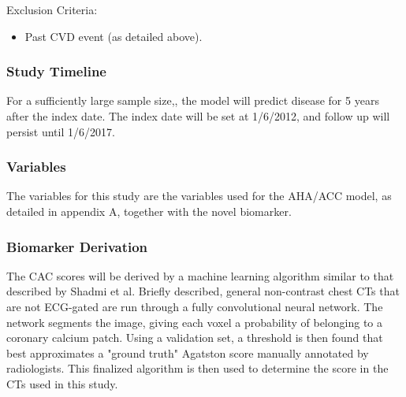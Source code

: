 \documentclass[a4paper,12pt]{article}
\begin{document}
		Exclusion Criteria:
		\begin{itemize}
			\item Past CVD event (as detailed above).
		\end{itemize}
		
		\subsubsection*{Study Timeline}
		For a sufficiently large sample size,, the model will predict disease for 5 years after the index date. The index date will be set at 1/6/2012, and follow up will persist until 1/6/2017.
		
		\subsubsection*{Variables}
		The variables for this study are the variables used for the AHA/ACC model, as detailed in appendix A, together with the novel biomarker.
		
		\subsubsection*{Biomarker Derivation}
		The CAC scores will be derived by a machine learning algorithm similar to that described by Shadmi et al\cite{Shadmi2018}. Briefly described, general non-contrast chest CTs that are not ECG-gated are run through a fully convolutional neural network. The network segments the image, giving each voxel a probability of belonging to a coronary calcium patch. Using a validation set, a threshold is then found that best approximates a "ground truth" Agatston score manually annotated by radiologists. This finalized algorithm is then used to determine the score in the CTs used in this study.
		
\end{document}
